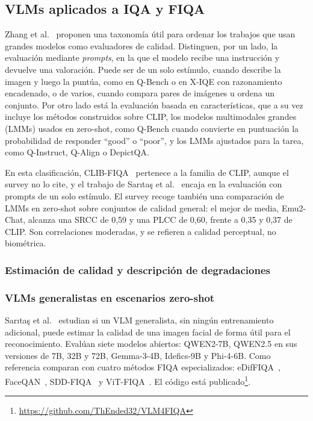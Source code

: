 \subsection{VLMs aplicados a IQA y FIQA}
Zhang et al.~\cite{Zhang_2025_TOMM} proponen una taxonomía útil para ordenar los trabajos que usan grandes modelos como evaluadores de calidad. Distinguen, por un lado, la evaluación mediante \textit{prompts}, en la que el modelo recibe una instrucción y devuelve una valoración. Puede ser de un solo estímulo, cuando describe la imagen y luego la puntúa, como en Q-Bench o en X-IQE con razonamiento encadenado, o de varios, cuando compara pares de imágenes u ordena un conjunto. Por otro lado está la evaluación basada en características, que a su vez incluye los métodos construidos sobre CLIP, los modelos multimodales grandes (LMMs) usados en zero-shot, como Q-Bench cuando convierte en puntuación la probabilidad de responder ``good'' o ``poor'', y los LMMs ajustados para la tarea, como Q-Instruct, Q-Align o DepictQA.

En esta clasificación, CLIB-FIQA~\cite{Ou_2024_CVPR} pertenece a la familia de CLIP, aunque el survey no lo cite, y el trabajo de Sarıtaş et al.~\cite{Saritas_2026_FG} encaja en la evaluación con prompts de un solo estímulo. El survey recoge también una comparación de LMMs en zero-shot sobre conjuntos de calidad general: el mejor de media, Emu2-Chat, alcanza una SRCC de 0,59 y una PLCC de 0,60, frente a 0,35 y 0,37 de CLIP. Son correlaciones moderadas, y se refieren a calidad perceptual, no biométrica.

\subsubsection{Estimación de calidad y descripción de degradaciones}

\subsubsection{VLMs generalistas en escenarios zero-shot}
\label{sec:saritas}
Sarıtaş et al.~\cite{Saritas_2026_FG} estudian si un VLM generalista, sin ningún entrenamiento adicional, puede estimar la calidad de una imagen facial de forma útil para el reconocimiento. Evalúan siete modelos abiertos: QWEN2-7B, QWEN2.5 en sus versiones de 7B, 32B y 72B, Gemma-3-4B, Idefics-9B y Phi-4-6B. Como referencia comparan con cuatro métodos FIQA especializados: eDifFIQA~\cite{Babnik_2024_TBIOM}, FaceQAN~\cite{Babnik_2022_ICPR}, SDD-FIQA~\cite{Ou_2021_CVPR} y ViT-FIQA~\cite{Atzori_2025_ICCVW}. El código está publicado\footnote{\url{https://github.com/ThEnded32/VLM4FIQA}}.

